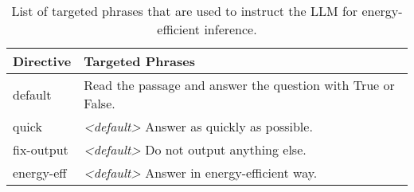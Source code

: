 


\begin{table}[!t]
    \centering
    \footnotesize
    \begin{tabular}{p{14mm}|p{54mm}}
    \toprule
    \textbf{Directive} &
    \textbf{Targeted Phrases} \\
    \midrule
    default & Read the passage and answer the question with True or False. \\
    quick & \textit{<default>} Answer as quickly as possible. \\
    fix-output & \textit{<default>} Do not output anything else. \\
    energy-eff & \textit{<default>} Answer in energy-efficient way. \\
    \bottomrule
    \end{tabular}
    \caption{List of targeted phrases that are used to instruct the LLM for energy-efficient inference.}
    \label{tab:prompts}
\end{table}
